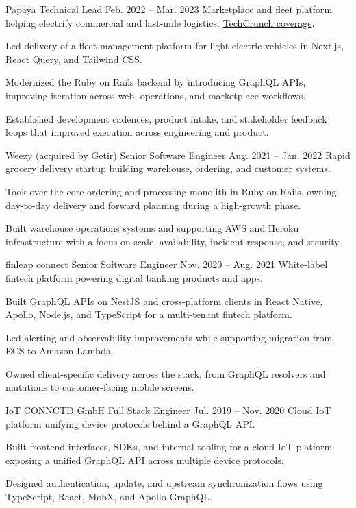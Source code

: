 \ResumeJob
  {Papaya}
  {Technical Lead}
  {Feb. 2022 -- Mar. 2023}
  {Marketplace and fleet platform helping electrify commercial and last-mile logistics. \href{https://techcrunch.com/2022/09/27/papaya-wants-to-help-electrify-last-mile-logistics-in-europe/}{TechCrunch coverage}.}
\begin{ResumeList}
  \item Led delivery of a fleet management platform for light electric vehicles in Next.js, React Query, and Tailwind CSS.
  \item Modernized the Ruby on Rails backend by introducing GraphQL APIs, improving iteration across web, operations, and marketplace workflows.
  \item Established development cadences, product intake, and stakeholder feedback loops that improved execution across engineering and product.
\end{ResumeList}

\ResumeJob
  {Weezy (acquired by Getir)}
  {Senior Software Engineer}
  {Aug. 2021 -- Jan. 2022}
  {Rapid grocery delivery startup building warehouse, ordering, and customer systems.}
\begin{ResumeList}
  \item Took over the core ordering and processing monolith in Ruby on Rails, owning day-to-day delivery and forward planning during a high-growth phase.
  \item Built warehouse operations systems and supporting AWS and Heroku infrastructure with a focus on scale, availability, incident response, and security.
\end{ResumeList}

\ResumeJob
  {finleap connect}
  {Senior Software Engineer}
  {Nov. 2020 -- Aug. 2021}
  {White-label fintech platform powering digital banking products and apps.}
\begin{ResumeList}
  \item Built GraphQL APIs on NestJS and cross-platform clients in React Native, Apollo, Node.js, and TypeScript for a multi-tenant fintech platform.
  \item Led alerting and observability improvements while supporting migration from ECS to Amazon Lambda.
  \item Owned client-specific delivery across the stack, from GraphQL resolvers and mutations to customer-facing mobile screens.
\end{ResumeList}

\ResumeJob
  {IoT CONNCTD GmbH}
  {Full Stack Engineer}
  {Jul. 2019 -- Nov. 2020}
  {Cloud IoT platform unifying device protocols behind a GraphQL API.}
\begin{ResumeList}
  \item Built frontend interfaces, SDKs, and internal tooling for a cloud IoT platform exposing a unified GraphQL API across multiple device protocols.
  \item Designed authentication, update, and upstream synchronization flows using TypeScript, React, MobX, and Apollo GraphQL.
\end{ResumeList}
